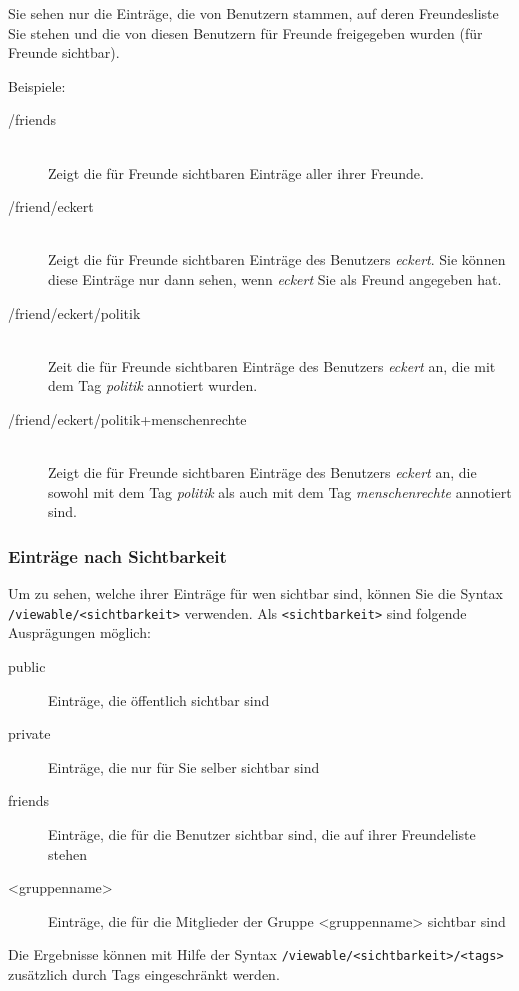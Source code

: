 Sie sehen nur die Einträge, die von Benutzern stammen, auf deren Freundesliste Sie stehen und die von diesen Benutzern für Freunde freigegeben wurden (für Freunde sichtbar).

Beispiele:
\begin{description}
    \item [/friends] \hfill \\
    Zeigt die für Freunde sichtbaren Einträge aller ihrer Freunde.
    \item [/friend/eckert] \hfill \\
    Zeigt die für Freunde sichtbaren Einträge des Benutzers \textit{eckert}. Sie können diese Einträge nur dann sehen, wenn \textit{eckert} Sie als Freund angegeben hat.
    \item [/friend/eckert/politik] \hfill \\
    Zeit die für Freunde sichtbaren Einträge des Benutzers \textit{eckert} an, die mit dem Tag \textit{politik} annotiert wurden. 
    \item [/friend/eckert/politik+menschenrechte] \hfill \\
    Zeigt die für Freunde sichtbaren Einträge des Benutzers \textit{eckert} an, die sowohl mit dem Tag \textit{politik} als auch mit dem Tag \textit{menschenrechte} annotiert sind. 
\end{description}

\subsubsection*{Einträge nach Sichtbarkeit}
\label{sss:nachSichtbarkeit}
Um zu sehen, welche ihrer Einträge für wen sichtbar sind, können Sie die Syntax \texttt{/viewable/<sichtbarkeit>} verwenden. Als \texttt{<sichtbarkeit>} sind folgende Ausprägungen möglich:
\begin{description}
  \item[public] Einträge, die öffentlich sichtbar sind
	\item[private] Einträge, die nur für Sie selber sichtbar sind
	\item[friends] Einträge, die für die Benutzer sichtbar sind, die auf ihrer Freundeliste stehen
	\item[<gruppenname>] Einträge, die für die Mitglieder der Gruppe <gruppenname> sichtbar sind
\end{description}  

Die Ergebnisse können mit Hilfe der Syntax \texttt{/viewable/<sichtbarkeit>/<tags>} zusätzlich durch Tags eingeschränkt werden. 

